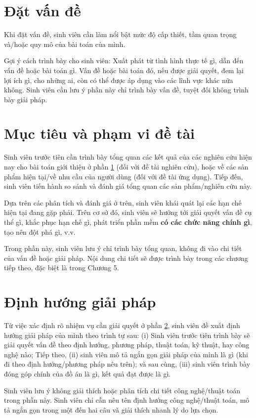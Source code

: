 \documentclass[../DoAn.tex]{subfiles}
\begin{document}
\section{Đặt vấn đề}
\label{section:1.1}
Khi đặt vấn đề, sinh viên cần làm nổi bật mức độ cấp thiết, tầm quan trọng và/hoặc quy mô của bài toán của mình.

Gợi ý cách trình bày cho sinh viên: Xuất phát từ tình hình thực tế gì, dẫn đến vấn đề hoặc bài toán gì. Vấn đề hoặc bài toán đó, nếu được giải quyết, đem lại lợi ích gì, cho những ai, còn có thể được áp dụng vào các lĩnh vực khác nữa không. Sinh viên cần lưu ý phần này chỉ trình bày vấn đề, tuyệt đối không trình bày giải pháp.

\section{Mục tiêu và phạm vi đề tài}
\label{section:1.2}
Sinh viên trước tiên cần trình bày tổng quan các kết quả của các nghiên cứu hiện nay cho bài toán giới thiệu ở phần \ref{section:1.1} (đối với đề tài nghiên cứu), hoặc về các sản phẩm hiện tại/về nhu cầu của người dùng (đối với đề tài ứng dụng). Tiếp đến, sinh viên tiến hành so sánh và đánh giá tổng quan các sản phẩm/nghiên cứu này.

Dựa trên các phân tích và đánh giá ở trên, sinh viên khái quát lại các hạn chế hiện tại đang gặp phải. Trên cơ sở đó, sinh viên sẽ hướng tới giải quyết vấn đề cụ thể gì, khắc phục hạn chế gì, phát triển phần mềm \textbf{có các chức năng chính gì}, tạo nên đột phá gì, v.v.

Trong phần này, sinh viên lưu ý chỉ trình bày tổng quan, không đi vào chi tiết của vấn đề hoặc giải pháp. Nội dung chi tiết sẽ được trình bày trong các chương tiếp theo, đặc biệt là trong Chương 5.

\section{Định hướng giải pháp}
\label{section:1.3}
Từ việc xác định rõ nhiệm vụ cần giải quyết ở phần \ref{section:1.2}, sinh viên đề xuất định hướng giải pháp của mình theo trình tự sau: (i) Sinh viên trước tiên trình bày sẽ giải quyết vấn đề theo định hướng, phương pháp, thuật toán, kỹ thuật, hay công nghệ nào; Tiếp theo, (ii) sinh viên mô tả ngắn gọn giải pháp của mình là gì (khi đi theo định hướng/phương pháp nêu trên); và sau cùng, (iii) sinh viên trình bày đóng góp chính của đồ án là gì, kết quả đạt được là gì.

Sinh viên lưu ý không giải thích hoặc phân tích chi tiết công nghệ/thuật toán trong phần này. Sinh viên chỉ cần nêu tên định hướng công nghệ/thuật toán, mô tả ngắn gọn trong một đến hai câu và giải thích nhanh lý do lựa chọn.
\end{document}
